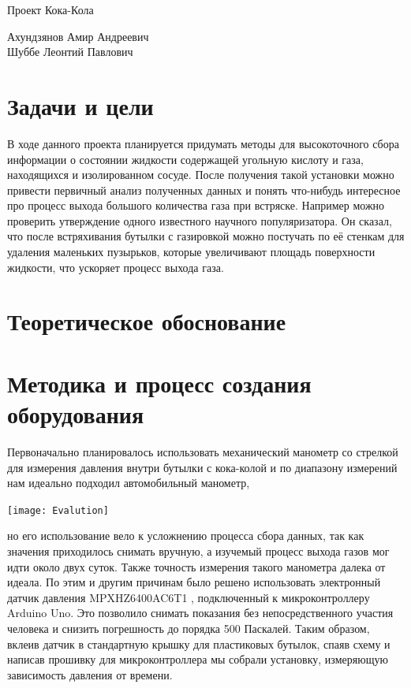 \documentclass[12pt,a4paper]{scrartcl}
\begin{document}
\begin{center}
\begin{large}
Проект Кока-Кола
\end{large}
	\bigskip
     
Ахундзянов Амир Андреевич\\
Шуббе Леонтий Павлович
\end{center}

\section{Задачи и цели}
В ходе данного проекта планируется придумать методы для высокоточного сбора информации о состоянии жидкости  содержащей угольную кислоту и газа, находящихся и изолированном сосуде. После получения такой установки можно привести первичный анализ полученных данных и понять что-нибудь интересное про процесс выхода большого количества газа при встряске. Например можно проверить утверждение одного известного научного популяризатора. Он сказал, что после встряхивания бутылки с газировкой можно постучать по её стенкам для удаления маленьких пузырьков, которые увеличивают площадь поверхности жидкости, что ускоряет процесс выхода газа.

\section{Теоретическое обоснование}



\section{Методика и процесс создания оборудования}
Первоначально планировалось использовать механический манометр со стрелкой для измерения давления внутри бутылки с кока-колой и по диапазону измерений нам идеально подходил автомобильный манометр,\\
\begin{flushleft}
\texttt{[image: Evalution]}
\end{flushleft}

 но его использование вело к усложнению процесса сбора данных, так как значения приходилось снимать вручную, а изучемый процесс выхода газов мог идти около двух суток. Также точность измерения такого манометра далека от идеала. По этим и другим причинам было решено использовать электронный датчик давления MPXHZ6400AC6T1 , подключенный к микроконтроллеру Arduino Uno. Это позволило снимать показания без непосредственного участия человека и снизить погрешность до порядка 500 Паскалей. Таким образом, вклеив датчик в стандартную крышку для пластиковых бутылок, спаяв схему и написав прошивку для микроконтроллера мы собрали установку, измеряющую зависимость давления от времени.
\end{document}
